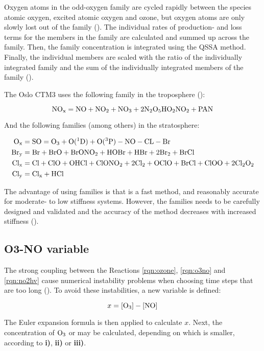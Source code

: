 Oxygen atoms in the odd-oxygen family are cycled rapidly between the species atomic oxygen, excited atomic oxygen and ozone, but oxygen atoms are only slowly lost out of the family (\cite{AtmModFund}). The individual rates of production- and loss terms for the members in the family are calculated and summed up across the family. Then, the family concentration is integrated using the QSSA method. Finally, the individual members are scaled with the ratio of the individually integrated family and the sum of the individually integrated members of the family (\cite{SovdeManual}).

\medskip

The Oslo CTM3 uses the following family in the troposphere (\cite{SovdeManual}): 

\begin{equation*}
    \mathrm{NO_x} = \mathrm{NO} + \mathrm{NO_2} + \mathrm{NO_3} + 2\mathrm{N_2O_5} \mathrm{HO_2NO_2} + \mathrm{PAN}    
\end{equation*}

And the following families (among others) in the stratosphere:

\begin{align*}
    \mathrm{O_x} & = \mathrm{SO} = \mathrm{O_3} + \mathrm{O(^1D)} + \mathrm{O(^3P)} - \mathrm{NO} - \mathrm{CL} - \mathrm{Br} \\
    \mathrm{Br_y} & = \mathrm{Br} + \mathrm{BrO} + \mathrm{BrONO_2} + \mathrm{HOBr} + \mathrm{HBr} + 2\mathrm{Br_2} + \mathrm{BrCl} \\
    \mathrm{Cl_x} & = \mathrm{Cl} + \mathrm{ClO} + \mathrm{OHCl} + \mathrm{ClONO_2} + 2\mathrm{Cl_2} + \mathrm{OClO} + \mathrm{BrCl} + \mathrm{ClOO} + 2\mathrm{Cl_2O_2} \\
    \mathrm{Cl_y} & = \mathrm{Cl_x} + \mathrm{HCl}
\end{align*}

The advantage of using families is that is a fast method, and reasonably accurate for moderate- to low stiffness systems. However, the families needs to be carefully designed and validated and the accuracy of the method decreases with increased stiffness (\cite{AtmModFund}).


\subsection{O3-NO variable}\label{sec:O3-NO}

The strong coupling between the Reactions \ref{rqn:ozone}, \ref{rqn:o3no} and \ref{rqn:no2hv} cause numerical instability problems when choosing time steps that are too long (\cite{Hesstvedt1978}). To avoid these instabilities, a new variable is defined: 

\begin{equation}
    x = [\mathrm{O_3}] - [\mathrm{NO}]
\end{equation}

The Euler expansion formula is then applied to calculate $x$. Next, the concentration of $\mathrm{O_3}$ or  may be calculated, depending on which is smaller, according to \textbf{i)}, \textbf{ii)} or \textbf{iii)}. 